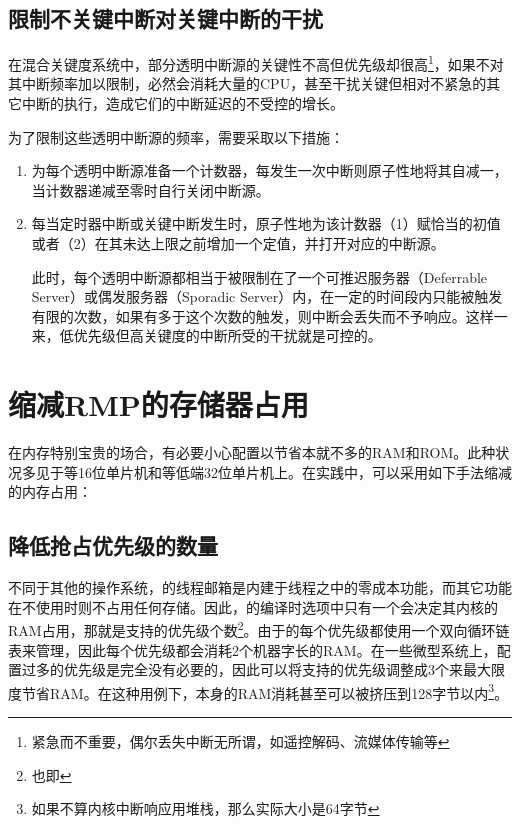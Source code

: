 \subsection{限制不关键中断对关键中断的干扰}\label{subsec:limiting-interference-from-non-critical-interrupts-on-critical-interrupts}

在混合关键度系统中，部分透明中断源的关键性不高但优先级却很高\footnote{紧急而不重要，偶尔丢失中断无所谓，如遥控解码、流媒体传输等}，如果不对其中断频率加以限制，必然会消耗大量的CPU，甚至干扰关键但相对不紧急的其它中断的执行，造成它们的中断延迟的不受控的增长。

为了限制这些透明中断源的频率，需要采取以下措施：

\begin{enumerate}
\def\labelenumi{\arabic{enumi}.}
\item
  为每个透明中断源准备一个计数器，每发生一次中断则原子性地将其自减一，当计数器递减至零时自行关闭中断源。
\item
  每当定时器中断或关键中断发生时，原子性地为该计数器（1）赋恰当的初值或者（2）在其未达上限之前增加一个定值，并打开对应的中断源。

  此时，每个透明中断源都相当于被限制在了一个可推迟服务器（Deferrable
  Server）或偶发服务器（Sporadic
  Server）内，在一定的时间段内只能被触发有限的次数，如果有多于这个次数的触发，则中断会丢失而不予响应。这样一来，低优先级但高关键度的中断所受的干扰就是可控的。
\end{enumerate}

\section{缩减RMP的存储器占用}\label{sec:reducing-the-memory-footprint-of-rmp}

在内存特别宝贵的场合，有必要小心配置以节省本就不多的RAM和ROM。此种状况多见于等16位单片机和等低端32位单片机上。在实践中，可以采用如下手法缩减的内存占用：

\subsection{降低抢占优先级的数量}\label{subsec:reducing-the-number-of-preemption-priorities}

不同于其他的操作系统，的线程邮箱是内建于线程之中的零成本功能，而其它功能在不使用时则不占用任何存储。因此，的编译时选项中只有一个会决定其内核的RAM占用，那就是支持的优先级个数\footnote{也即}。由于的每个优先级都使用一个双向循环链表来管理，因此每个优先级都会消耗2个机器字长的RAM。在一些微型系统上，配置过多的优先级是完全没有必要的，因此可以将支持的优先级调整成3个来最大限度节省RAM。在这种用例下，本身的RAM消耗甚至可以被挤压到128字节以内\footnote{如果不算内核中断响应用堆栈，那么实际大小是64字节}。

